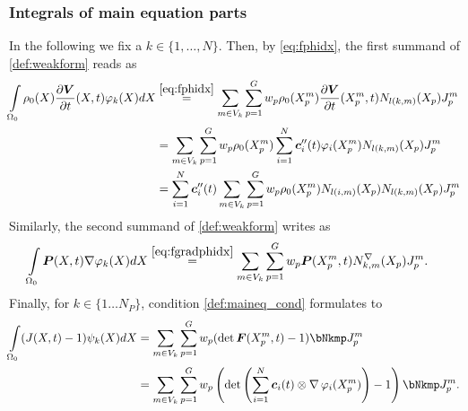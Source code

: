 \subsubsection{Integrals of main equation parts}
In the following we fix a $k\in\{1,\ldots, N\}$.
Then, by \eqref{eq:fphidx}, the first summand of \eqref{def:weakform} reads as
\begin{align*}
	\intor \rho_0(X)\d{\vV}{t}(X,t)\varphi_k(X)dX
		&\re{eq:fphidx} \sumvk\sumgp w_p \rho_0(\pmp)\d{\vV}{t}(\pmp,t)N_{l(k,m)}(X_p)\jmp\\
		&= \sumvk\sumgp w_p \rho_0(\pmp)\sumi \vc_i''(t)\varphi_i(\pmp) N_{l(k,m)}(X_p)\jmp\\
		&= \sumi \vc_i''(t)\sumvk\sumgp w_p \rho_0(\pmp)N_{l(i,m)}(X_p) N_{l(k,m)}(X_p)\jmp
\end{align*}
Similarly, the second summand of \eqref{def:weakform} writes as
\begin{align*}
		\intor\vP(X,t)\dpk dX &\re{eq:fgradphidx} \sumvk\sumgp w_p\vP(\pmp,t)\dNkmp\jmp.
\end{align*}
Finally, for $k\in\{1\ldots N_P\}$, condition \eqref{def:maineq_cond} formulates to
\begin{align}
	\intor (J(X,t)-1)\psi_k(X)dX &= \sumvk\sumgp w_p (\det\vF(\pmp,t)-1) \bNkmp\jmp\label{eq:weak_incomp_condition}\\
	&= \sumvk\sumgp w_p \left(\det\left(\sumi \vc_i(t)\otimes \divergence\varphi_i(\pmp)\right)-1\right) \bNkmp\jmp.\nonumber
\end{align}

